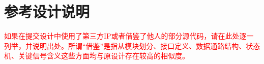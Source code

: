 \section{参考设计说明}
\textcolor{red}{如果在提交设计中使用了第三方IP或者借鉴了他人的部分源代码，请在此处逐一列举，并说明出处。所谓“借鉴”是指从模块划分、接口定义、数据通路结构、状态机、关键信号含义这些方面均与原设计存在较高的相似度。}